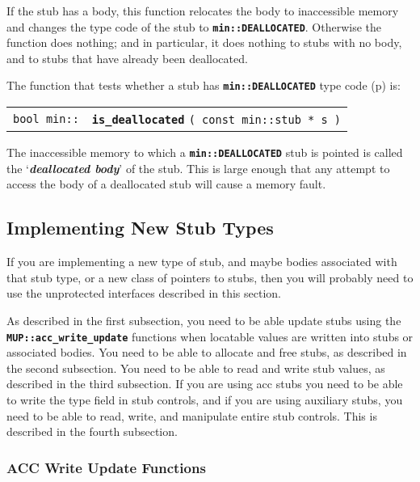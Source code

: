 \documentclass[12pt]{article}
\makeatletter
\newcommand{\TT}[1]{{\tt \bfseries #1}}
\newcommand{\key}[1]{{\bf \em #1}\index{#1}}
\newcommand{\ttindex}[1]{\index{#1@{\tt #1}}}
\newcommand{\minindex}[1]{\ttindex{min::#1}\ttindex{#1}}
\newcommand{\pagref}[1]{p\pageref{#1}}
\newcommand{\EOL}{\penalty \exhyphenpenalty}
\newenvironment{indpar}[1][0.3in]%
	{\begin{list}{}%
		     {\setlength{\itemsep}{0in}%
		      \setlength{\topsep}{0in}%
		      \setlength{\parsep}{1ex}%
		      \setlength{\labelwidth}{#1}%
		      \setlength{\leftmargin}{#1}%
		      \addtolength{\leftmargin}{\labelsep}}%
	 \item}%
	{\end{list}}
\newcommand{\LABEL}[1]{\label{#1}}
\newcommand{\MINKEY}[1]{{\tt \bf #1}\minindex{#1}}
\makeatother
\begin{document}
If the stub has a body, this function relocates the body to inaccessible
memory and changes the type code of the stub to
\TT{min::DEALLOCATED}.  Otherwise the function does nothing; and
in particular, it does nothing to stubs with no body, and to stubs
that have already been deallocated.

The function that tests whether a stub
has \TT{min::DEALLOCATED} type code (\pagref{MIN::DEALLOCATED}) is:

\begin{indpar}\begin{tabular}{r@{}l}
\verb|bool min::| & \MINKEY{is\_deallocated} \verb|( const min::stub * s )|
\LABEL{MIN::IS_DEALLOCATED}
\end{tabular}\end{indpar}

The inaccessible memory to which a \TT{min::DEALLOCATED} stub is
pointed is called the `\key{deallocated body}' of the stub.
This is large enough that any attempt to access the body of a
deallocated stub will cause a memory fault.

\subsection{Implementing New Stub Types}
\label{IMPLEMENTING-NEW-STUB-TYPES}

If you are implementing a new type of stub, and maybe bodies
associated with that stub type, or a new class of pointers to stubs,
then you will probably need to use the unprotected
interfaces described in this section.

As described in the first subsection, you need to be able update stubs
using the \TT{MUP::\EOL acc\_\EOL write\_\EOL update} functions
when locatable values are written into stubs or associated bodies.
You need to be able to allocate and free stubs, as described in the
second subsection.  You need to be able to read and write stub values,
as described in the third subsection.  If you are using acc stubs you
need to be able to write the type field in stub controls, and if
you are using auxiliary stubs, you need to be able to read, write,
and manipulate entire stub controls.
This is described in the fourth subsection.

\subsubsection{ACC Write Update Functions}
\label{ACC-WRITE-UPDATE-FUNCTIONS}
\end{document}
